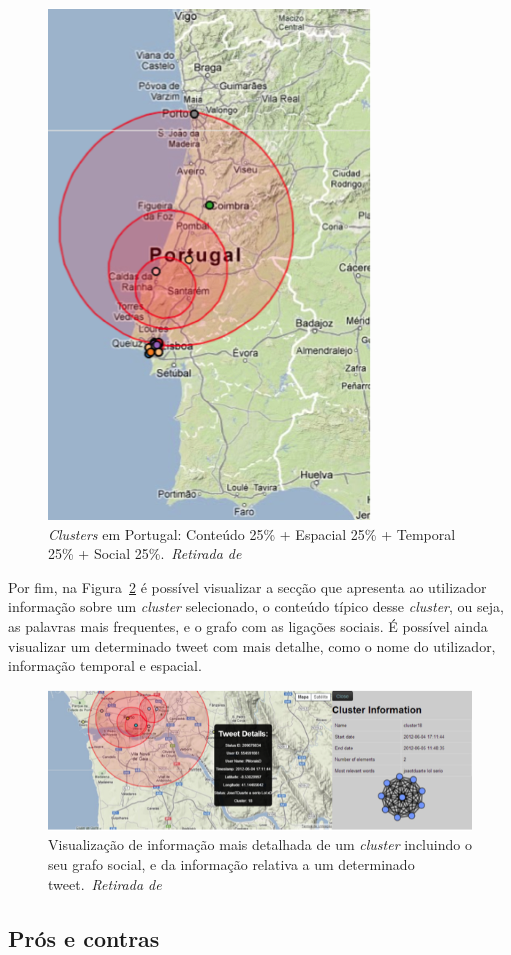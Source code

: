 \begin{figure}[h]
\centering
\includegraphics[width=0.35\linewidth]{./figures/tweeprofiles/extp5.png}
\caption{\textit{Clusters} em Portugal: Conteúdo 25\% + Espacial 25\% + Temporal 25\% + Social 25\%.~\textit{Retirada de}~\cite{Cunha2013}}
\label{fig:tweepex2}
\end{figure}

Por fim, na Figura~\ref{fig:tweepex3} é possível visualizar a secção que apresenta ao utilizador informação sobre um \textit{cluster} selecionado, o conteúdo típico desse \textit{cluster}, ou seja, as palavras mais frequentes, e o grafo com as ligações sociais. É possível ainda visualizar um determinado tweet com mais detalhe, como o nome do utilizador, informação temporal e espacial.

\begin{figure}[h]
\centering
\includegraphics[width=1.0\linewidth]{./figures/tweeprofiles/extp6.png}
\caption{Visualização de informação mais detalhada de um \textit{cluster} incluindo o seu grafo social, e da informação relativa a um determinado tweet.~\textit{Retirada de}~\cite{Cunha2013}}
\label{fig:tweepex3}
\end{figure}

\subsection{Prós e contras}

